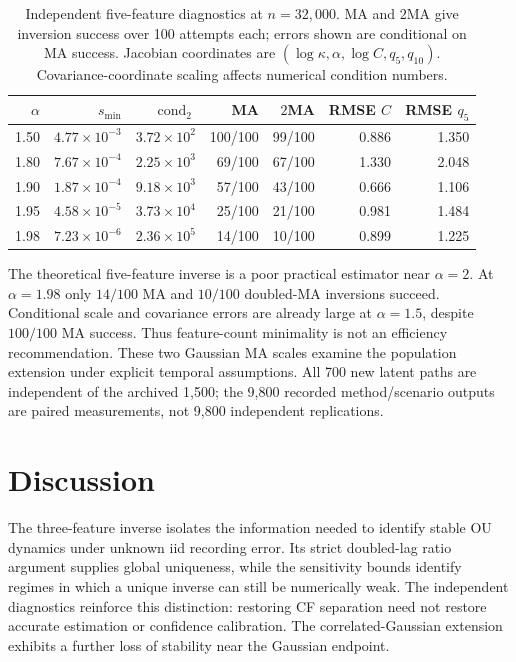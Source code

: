 \documentclass[11pt,a4paper]{article}
\theoremstyle{remark}\newtheorem{remark}[theorem]{Remark}
\begin{document}
\begin{table}[htbp]
\centering\small
\caption{Independent five-feature diagnostics at $n=32{,}000$. MA and $2$MA give inversion success over 100 attempts each; errors shown are conditional on MA success. Jacobian coordinates are $(\log\kappa,\alpha,\log C,q_5,q_{10})$. Covariance-coordinate scaling affects numerical condition numbers.}\label{tab:five}
\begin{tabular}{rrrrrrr}\toprule
$\alpha$ & $s_{\min}$ & $\operatorname{cond}_2$ & MA & $2$MA & RMSE $C$ & RMSE $q_5$ \\ \midrule
1.50 & $4.77\times10^{-3}$ & $3.72\times10^{2}$ & 100/100 & 99/100 & 0.886 & 1.350 \\
1.80 & $7.67\times10^{-4}$ & $2.25\times10^{3}$ & 69/100 & 67/100 & 1.330 & 2.048 \\
1.90 & $1.87\times10^{-4}$ & $9.18\times10^{3}$ & 57/100 & 43/100 & 0.666 & 1.106 \\
1.95 & $4.58\times10^{-5}$ & $3.73\times10^{4}$ & 25/100 & 21/100 & 0.981 & 1.484 \\
1.98 & $7.23\times10^{-6}$ & $2.36\times10^{5}$ & 14/100 & 10/100 & 0.899 & 1.225 \\
\bottomrule\end{tabular}
\end{table}

The theoretical five-feature inverse is a poor practical estimator near $\alpha=2$. At $\alpha=1.98$ only $14/100$ MA and $10/100$ doubled-MA inversions succeed. Conditional scale and covariance errors are already large at $\alpha=1.5$, despite $100/100$ MA success. Thus feature-count minimality is not an efficiency recommendation. These two Gaussian MA scales examine the population extension under explicit temporal assumptions. All 700 new latent paths are independent of the archived 1,500; the 9,800 recorded method/scenario outputs are paired measurements, not 9,800 independent replications.

\section{Discussion}\label{sec:discussion}
The three-feature inverse isolates the information needed to identify stable OU dynamics under unknown iid recording error. Its strict doubled-lag ratio argument supplies global uniqueness, while the sensitivity bounds identify regimes in which a unique inverse can still be numerically weak. The independent diagnostics reinforce this distinction: restoring CF separation need not restore accurate estimation or confidence calibration. The correlated-Gaussian extension exhibits a further loss of stability near the Gaussian endpoint.
\end{document}
